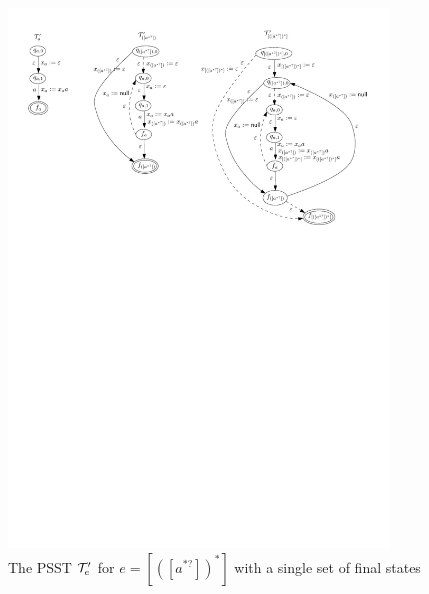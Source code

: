 \begin{example}
%
	\begin{figure}[tb]
		\centering
		\includegraphics[width=0.9\textwidth]{psst-partition.pdf}
		\caption{The PSST $\mathcal{T}^\prime_e$ for $e = [([a^{*?}])^{*}]$ with a single set of final states}
		\label{fig-psst-partition}
	\end{figure}
\end{example}


